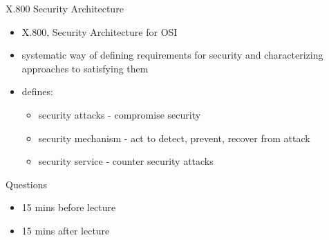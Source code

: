 \documentclass{beamer}
\begin{document}
\begin{frame}{X.800 Security Architecture}
  \begin{itemize}
    \item X.800, Security Architecture for OSI 
    \item systematic way of defining requirements for 
    security and characterizing approaches to 
    satisfying them 
    \item defines: 
      \begin{itemize}
        \item security attacks - compromise security 
        \item security mechanism - act to detect, prevent, 
        recover from attack 
        \item security service - counter security attacks 
      \end{itemize}
  \end{itemize}
\end{frame}

\begin{frame}{Questions}
  \begin{itemize}
    \item 15 mins before lecture
    \item 15 mins after lecture
  \end{itemize}
\end{frame}
\end{document}

